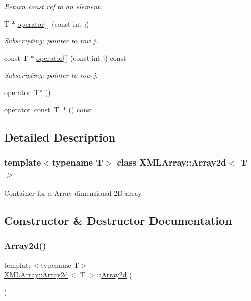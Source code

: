 \begin{DoxyCompactItemize}
\begin{DoxyCompactList}\small\item\em Return const ref to an element. \end{DoxyCompactList}\item 
T $\ast$ \mbox{\hyperlink{classXMLArray_1_1Array2d_a1e5b7fa596ec682113700320b08e66d5}{operator\mbox{[}$\,$\mbox{]}}} (const int j)
\begin{DoxyCompactList}\small\item\em Subscripting\+: pointer to row j. \end{DoxyCompactList}\item 
const T $\ast$ \mbox{\hyperlink{classXMLArray_1_1Array2d_a956a4739a0e6529302542b0fdf3c1da8}{operator\mbox{[}$\,$\mbox{]}}} (const int j) const
\begin{DoxyCompactList}\small\item\em Subscripting\+: pointer to row j. \end{DoxyCompactList}\item 
\mbox{\hyperlink{classXMLArray_1_1Array2d_a9d46505eb6c4149239bc87ba408c6b5b}{operator T$\ast$}} ()
\item 
\mbox{\hyperlink{classXMLArray_1_1Array2d_aabd815b03d3dfbcc079cab62408c6dfd}{operator const T $\ast$}} () const
\end{DoxyCompactItemize}


\subsection{Detailed Description}
\subsubsection*{template$<$typename T$>$\newline
class X\+M\+L\+Array\+::\+Array2d$<$ T $>$}

Container for a Array-\/dimensional 2D array. 

\subsection{Constructor \& Destructor Documentation}
\mbox{\label{classXMLArray_1_1Array2d_a2f24eccb279e2f1685b58b41f61d9330}} 
\subsubsection{\texorpdfstring{Array2d()}{Array2d()}\hspace{0.1cm}{\footnotesize\ttfamily [1/6]}}
{\footnotesize\ttfamily template$<$typename T$>$ \\
\mbox{\hyperlink{classXMLArray_1_1Array2d}{X\+M\+L\+Array\+::\+Array2d}}$<$ T $>$\+::\mbox{\hyperlink{classXMLArray_1_1Array2d}{Array2d}} (\begin{DoxyParamCaption}{ }\end{DoxyParamCaption})\hspace{0.3cm}{\ttfamily [inline]}}

